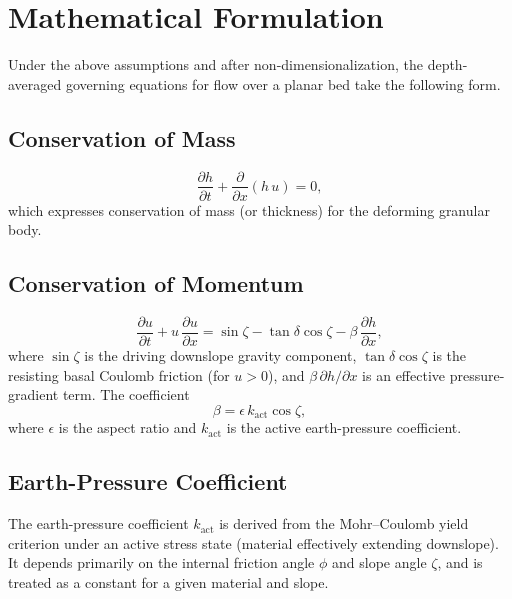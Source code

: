 \documentclass[10pt, conference]{FMFP2023}
\begin{document}
\section{Mathematical Formulation}

Under the above assumptions and after non-dimensionalization, the
depth-averaged governing equations for flow over a planar bed take the
following form.

\subsection{Conservation of Mass}

\begin{equation}
    \frac{\partial h}{\partial t}
    + \frac{\partial}{\partial x}(h\,u) = 0,
    \label{eq:mass}
\end{equation}
which expresses conservation of mass (or thickness) for the deforming
granular body.

\subsection{Conservation of Momentum}

\begin{equation}
    \frac{\partial u}{\partial t}
    + u\,\frac{\partial u}{\partial x}
    = \sin\zeta
    - \tan\delta\cos\zeta
    - \beta\,\frac{\partial h}{\partial x},
    \label{eq:momentum}
\end{equation}
where $\sin\zeta$ is the driving downslope gravity component,
$\tan\delta\cos\zeta$ is the resisting basal Coulomb friction (for
$u>0$), and $\beta\,\partial h/\partial x$ is an effective
pressure-gradient term.
The coefficient
\begin{equation}
    \beta = \epsilon\,k_{\text{act}}\cos\zeta,
\end{equation}
where $\epsilon$ is the aspect ratio and $k_{\text{act}}$ is the
active earth-pressure coefficient.

\subsection{Earth-Pressure Coefficient}

The earth-pressure coefficient $k_{\text{act}}$ is derived from the
Mohr--Coulomb yield criterion under an active stress state (material
effectively extending downslope).
It depends primarily on the internal friction angle $\phi$ and slope
angle $\zeta$, and is treated as a constant for a given material and
slope.
\end{document}

